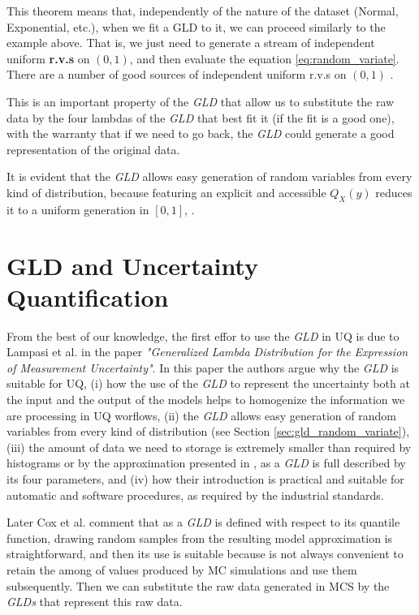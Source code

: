This theorem means that, independently of the nature of the dataset (Normal, Exponential, etc.), when we fit a GLD to it, we can proceed similarly to the example above. That is, we just need to generate a stream of independent uniform \textbf{r.v.s} on $(0, 1)$, and then evaluate the equation \ref{eq:random_variate}. There are a number of good sources of independent uniform r.v.s on $(0, 1)$ \cite{Karian2011}. 

This is an important property of the \textit{GLD} that allow us to substitute the raw data by the four lambdas of the \textit{GLD} that best fit it (if the fit is a good one), with the warranty that if we need to go back, the \textit{GLD} could generate a good representation of the original data.

It is evident that the \textit{GLD} allows easy generation of random variables from every kind of distribution, because featuring an explicit and accessible $Q_{X}(y)$ reduces it to a uniform generation in $[0,1]$, \cite{Lampasi2006}.


\section{GLD and Uncertainty Quantification}\label{sec:gld_and_uq}
From the best of our knowledge, the first effor to use the \textit{GLD} in UQ is due to Lampasi et al. \cite{Lampasi2006} in the paper \textit{"Generalized Lambda Distribution for the Expression of Measurement Uncertainty"}. In this paper the authors argue why the \textit{GLD} is suitable for UQ, (i) how the use of the \textit{GLD} to represent the uncertainty both at the input and the output of the models helps to homogenize the information we are processing in UQ worflows, (ii) the \textit{GLD} allows easy generation of random variables from every kind of distribution (see Section \ref{sec:gld_random_variate}), (iii) the amount of data we need to storage is extremely smaller than required by histograms or by the approximation presented in \cite{Jcgm2008}, as a \textit{GLD} is full described by its four parameters, and (iv) how their introduction is practical and suitable for automatic and software procedures, as required by the industrial standards.

Later Cox et al. \cite{Cox2012} comment that as a \textit{GLD} is defined with respect to its quantile function, drawing random samples from the resulting model approximation is straightforward, and then its use is suitable because is not always convenient to retain the among of values produced by MC simulations and use them subsequently. Then we can substitute the raw data generated in MCS by the \textit{GLDs} that represent this raw data.

